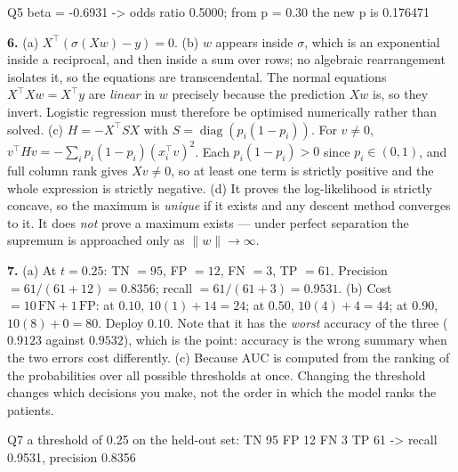 \documentclass[11pt]{article}
\begin{document}
\begin{codeout}
Q5  beta = -0.6931 -> odds ratio 0.5000; from p = 0.30 the new p is 0.176471
\end{codeout}

\medskip
\textbf{6.} (a) $X^{\!\top}(\sigma(Xw) - y) = 0$.
(b) $w$ appears inside $\sigma$, which is an exponential inside a reciprocal,
and then inside a sum over rows; no algebraic rearrangement isolates it, so
the equations are transcendental. The normal equations
$X^{\!\top}Xw = X^{\!\top}y$ are \emph{linear} in $w$ precisely because the
prediction $Xw$ is, so they invert. Logistic regression must therefore be
optimised numerically rather than solved.
(c) $H = -X^{\!\top}SX$ with $S = \operatorname{diag}(p_i(1-p_i))$. For
$v \neq 0$, $v^{\!\top}Hv = -\sum_i p_i(1-p_i)(x_i^{\!\top}v)^2$. Each
$p_i(1-p_i) > 0$ since $p_i \in (0,1)$, and full column rank gives
$Xv \neq 0$, so at least one term is strictly positive and the whole
expression is strictly negative.
(d) It proves the log-likelihood is strictly concave, so the maximum is
\emph{unique} if it exists and any descent method converges to it. It does
\emph{not} prove a maximum exists --- under perfect separation the supremum is
approached only as $\lVert w\rVert \to \infty$.

\medskip
\textbf{7.} (a) At $t = 0.25$: TN $= 95$, FP $= 12$, FN $= 3$, TP $= 61$.
Precision $= 61/(61+12) = 0.8356$; recall $= 61/(61+3) = 0.9531$.
(b) Cost $= 10\,\text{FN} + 1\,\text{FP}$:
at $0.10$, $10(1) + 14 = 24$;
at $0.50$, $10(4) + 4 = 44$;
at $0.90$, $10(8) + 0 = 80$.
Deploy $0.10$. Note that it has the \emph{worst} accuracy of the three
($0.9123$ against $0.9532$), which is the point: accuracy is the wrong summary
when the two errors cost differently.
(c) Because AUC is computed from the ranking of the probabilities over all
possible thresholds at once. Changing the threshold changes which decisions
you make, not the order in which the model ranks the patients.

\begin{codeout}
Q7  a threshold of 0.25 on the held-out set:
    TN 95 FP 12 FN 3 TP 61 -> recall 0.9531, precision 0.8356
\end{codeout}
\end{document}
